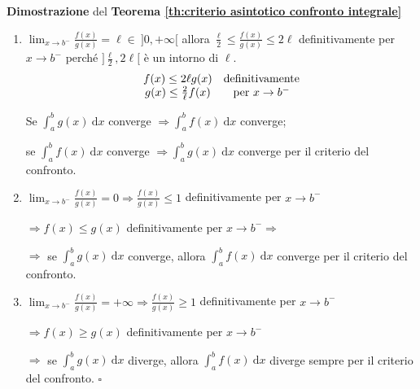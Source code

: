 \begin{dembar}
\textbf{Dimostrazione} del \textbf{Teorema \ref{th:criterio asintotico confronto integrale}}
\begin{enumerate}
	\item $\lim_{x \rightarrow b^-} \frac{f(x)}{g(x)} = \ell \in \ ]0,+\infty[$ 
	allora $\frac{\ell}{2} \leq \frac{f(x)}{g(x)} \leq 2\ell$ definitivamente per $x \rightarrow b^-$ perché $]\frac{\ell}{2},2\ell[$ è un intorno di $\ell$. 
	\begin{equation*}
	\begin{array}{c c}
		f(x) \leq 2 \ell g(x) & \text{definitivamente}
		\\
		g(x) \leq \frac{2}{\ell} f(x) & \text{per } x \rightarrow b^-
	\end{array} 
	\end{equation*}
	 
	Se $\int_{a}^{b} g(x) \ \mathrm{d}x$ converge $\Rightarrow \int_{a}^{b} f(x) \ \mathrm{d}x$ converge;
	
	se $\int_{a}^{b} f(x) \ \mathrm{
	d}x$ converge $\Rightarrow \int_{a}^{b} g(x) \ \mathrm{d}x$ converge per il criterio del confronto.
	
	\item $\lim_{x \rightarrow b^-} \frac{f(x)}{g(x)} = 0 \Rightarrow \frac{f(x)}{g(x)} \leq 1 $ definitivamente per $x\rightarrow b^-$ 
	
	$\Rightarrow f(x) \leq g(x)$ definitivamente per $x\rightarrow b^- \Rightarrow $ 
	
	$\Rightarrow$ se $\int_{a}^{b} g(x) \ \mathrm{d}x$ converge, allora $\int_{a}^{b} f(x) \ \mathrm{d}x$ converge per il criterio del confronto.
	
	\item $\lim_{x \rightarrow b^-} \frac{f(x)}{g(x)} = +\infty \Rightarrow \frac{f(x)}{g(x)} \geq 1$ definitivamente per $x \rightarrow b^-$ 
	
	$\Rightarrow f(x) \geq g(x)$ definitivamente per $x \rightarrow b^-$ 
	
	$\Rightarrow$ se $\int_{a}^{b} g(x) \ \mathrm{d}x$ diverge, allora $\int_{a}^{b} f(x) \ \mathrm{d}x$ diverge sempre per il criterio del confronto. $\square$
\end{enumerate}
\end{dembar}



